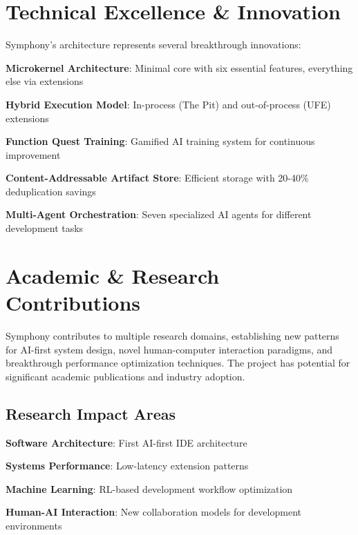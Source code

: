 \section*{Technical Excellence \& Innovation}

Symphony's architecture represents several breakthrough innovations:

\begin{expandedlist}
    \item \textbf{Microkernel Architecture}: Minimal core with six essential features, everything else via extensions
    \item \textbf{Hybrid Execution Model}: In-process (The Pit) and out-of-process (UFE) extensions
    \item \textbf{Function Quest Training}: Gamified AI training system for continuous improvement
    \item \textbf{Content-Addressable Artifact Store}: Efficient storage with 20-40\% deduplication savings
    \item \textbf{Multi-Agent Orchestration}: Seven specialized AI agents for different development tasks
\end{expandedlist}

\section*{Academic \& Research Contributions}

\begin{alertbox}
Symphony contributes to multiple research domains, establishing new patterns for AI-first system design, novel human-computer interaction paradigms, and breakthrough performance optimization techniques. The project has potential for significant academic publications and industry adoption.
\end{alertbox}

\subsection*{Research Impact Areas}
\begin{compactlist}
    \item \textbf{Software Architecture}: First  AI-first IDE architecture
    \item \textbf{Systems Performance}: Low-latency extension patterns
    \item \textbf{Machine Learning}: RL-based development workflow optimization
    \item \textbf{Human-AI Interaction}: New collaboration models for development environments
\end{compactlist}

